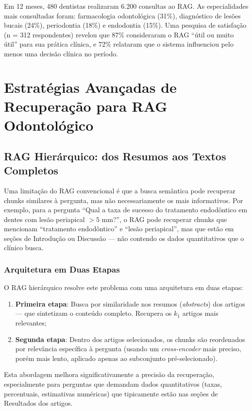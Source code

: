 Em 12 meses, 480 dentistas realizaram 6.200 consultas ao RAG. As especialidades mais consultadas foram: farmacologia odontológica (31\%), diagnóstico de lesões bucais (24\%), periodontia (18\%) e endodontia (15\%). Uma pesquisa de satisfação (n = 312 respondentes) revelou que 87\% consideraram o RAG ``útil ou muito útil'' para sua prática clínica, e 72\% relataram que o sistema influenciou pelo menos uma decisão clínica no período.

\section{Estratégias Avançadas de Recuperação para RAG Odontológico}

\subsection{RAG Hierárquico: dos Resumos aos Textos Completos}

Uma limitação do RAG convencional é que a busca semântica pode recuperar chunks similares à pergunta, mas não necessariamente os mais informativos. Por exemplo, para a pergunta ``Qual a taxa de sucesso do tratamento endodôntico em dentes com lesão periapical $>5$ mm?'', o RAG pode recuperar chunks que mencionam ``tratamento endodôntico'' e ``lesão periapical'', mas que estão em seções de Introdução ou Discussão --- não contendo os dados quantitativos que o clínico busca.

\subsubsection{Arquitetura em Duas Etapas}

O RAG hierárquico resolve este problema com uma arquitetura em duas etapas:
\begin{enumerate}
    \item \textbf{Primeira etapa}: Busca por similaridade nos resumos (\textit{abstracts}) dos artigos --- que sintetizam o conteúdo completo. Recupera os $k_1$ artigos mais relevantes;
    \item \textbf{Segunda etapa}: Dentro dos artigos selecionados, os chunks são reordenados por relevância específica à pergunta (usando um \textit{cross-encoder} mais preciso, porém mais lento, aplicado apenas ao subconjunto pré-selecionado).
\end{enumerate}

Esta abordagem melhora significativamente a precisão da recuperação, especialmente para perguntas que demandam dados quantitativos (taxas, percentuais, estimativas numéricas) que tipicamente estão nas seções de Resultados dos artigos.

